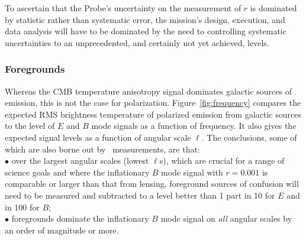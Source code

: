 To ascertain that the Probe's uncertainty on the measurement of $r$ is dominated by statistic rather than 
systematic error, the mission's design, execution, and data analysis will have to be dominated by the need
to controlling systematic uncertainties to an unprecedented, and certainly not yet achieved, levels. 

\vspace{-0.18in}

\subsubsection{Foregrounds}
\label{sec:foregrounds}

\vspace{-0.05in}


Whereas the CMB temperature anisotropy signal dominates galactic sources
of emission, this is not the case for polarization. 
Figure~\ref{fig:frequency} compares the expected RMS brightness temperature 
of polarized emission from galactic sources to the level of $E$ and $B$ mode signals
as a function of frequency. It also gives the expected signal levels as a function of angular scale $\ell$.  
The conclusions, some of which are also borne out by \planck\ measurements, are that: \\
$\bullet$ over the largest angular scales (lowest $\ell$s), which are crucial for a range 
of science goals and where the inflationary $B$ mode 
signal with $r =0.001$ is comparable or larger than that from lensing, foreground sources of confusion 
will need to be measured and subtracted to a level better than 1 part in 10 for $E$ and in 100 for $B$; \\
$\bullet$ foregrounds dominate the inflationary $B$ mode signal on {\it all} angular scales by 
an order of magnitude or more.

